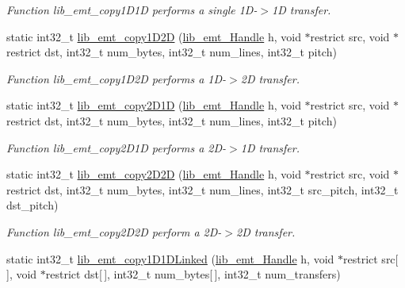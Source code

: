\begin{DoxyCompactItemize}
\begin{DoxyCompactList}\small\item\em Function lib\+\_\+emt\+\_\+copy1\+D1\+D performs a single 1\+D-\/$>$1\+D transfer. \end{DoxyCompactList}\item 
static int32\+\_\+t \hyperlink{group__libarch__memtrans_ga7eac2e886fc99a5be1086cb0fa6d9d4e}{lib\+\_\+emt\+\_\+copy1\+D2\+D} (\hyperlink{group__libarch__memtrans_ga3ee110c7c5d95cfe386b113d2d078ec3}{lib\+\_\+emt\+\_\+\+Handle} h, void $\ast$restrict src, void $\ast$restrict dst, int32\+\_\+t num\+\_\+bytes, int32\+\_\+t num\+\_\+lines, int32\+\_\+t pitch)
\begin{DoxyCompactList}\small\item\em Function lib\+\_\+emt\+\_\+copy1\+D2\+D performs a 1\+D-\/$>$2\+D transfer. \end{DoxyCompactList}\item 
static int32\+\_\+t \hyperlink{group__libarch__memtrans_gab6426d5afb67b7e9b4a8cff88135ab3f}{lib\+\_\+emt\+\_\+copy2\+D1\+D} (\hyperlink{group__libarch__memtrans_ga3ee110c7c5d95cfe386b113d2d078ec3}{lib\+\_\+emt\+\_\+\+Handle} h, void $\ast$restrict src, void $\ast$restrict dst, int32\+\_\+t num\+\_\+bytes, int32\+\_\+t num\+\_\+lines, int32\+\_\+t pitch)
\begin{DoxyCompactList}\small\item\em Function lib\+\_\+emt\+\_\+copy2\+D1\+D performs a 2\+D-\/$>$1\+D transfer. \end{DoxyCompactList}\item 
static int32\+\_\+t \hyperlink{group__libarch__memtrans_ga624053012144128867ef2a9ef808f264}{lib\+\_\+emt\+\_\+copy2\+D2\+D} (\hyperlink{group__libarch__memtrans_ga3ee110c7c5d95cfe386b113d2d078ec3}{lib\+\_\+emt\+\_\+\+Handle} h, void $\ast$restrict src, void $\ast$restrict dst, int32\+\_\+t num\+\_\+bytes, int32\+\_\+t num\+\_\+lines, int32\+\_\+t src\+\_\+pitch, int32\+\_\+t dst\+\_\+pitch)
\begin{DoxyCompactList}\small\item\em Function lib\+\_\+emt\+\_\+copy2\+D2\+D perform a 2\+D-\/$>$2\+D transfer. \end{DoxyCompactList}\item 
static int32\+\_\+t \hyperlink{group__libarch__memtrans_ga5f4e571bc160df4f1ccf934aaeaa325b}{lib\+\_\+emt\+\_\+copy1\+D1\+D\+Linked} (\hyperlink{group__libarch__memtrans_ga3ee110c7c5d95cfe386b113d2d078ec3}{lib\+\_\+emt\+\_\+\+Handle} h, void $\ast$restrict src\mbox{[}$\,$\mbox{]}, void $\ast$restrict dst\mbox{[}$\,$\mbox{]}, int32\+\_\+t num\+\_\+bytes\mbox{[}$\,$\mbox{]}, int32\+\_\+t num\+\_\+transfers)

\end{DoxyCompactItemize}
